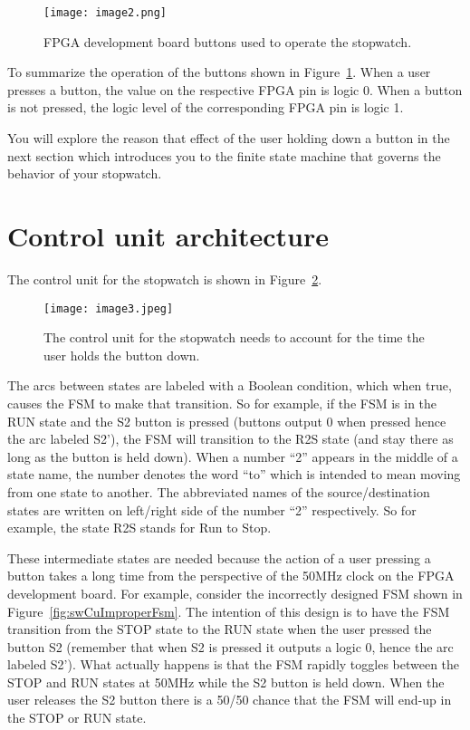 \begin{figure}[ht]
\texttt{[image: image2.png]}
\caption{FPGA development board buttons used to operate the stopwatch.}
\label{fig:swCuButtons}
\end{figure}

To summarize the operation of the buttons shown in Figure~\ref{fig:swCuButtons}. When a user
presses a button, the value on the respective FPGA pin is logic 0. When
a button is not pressed, the logic level of the corresponding FPGA pin
is logic 1.

You will explore the reason that effect of the user holding down a
button in the next section which introduces you to the finite state
machine that governs the behavior of your stopwatch.

\section{Control unit architecture}

The control unit for the stopwatch is shown in Figure~\ref{fig:swCuStateDiagram}.

\begin{figure}[ht]
\texttt{[image: image3.jpeg]}
\caption{The control unit for the stopwatch needs to account for the
time the user holds the button down.}
\label{fig:swCuStateDiagram}
\end{figure}

The arcs between states are labeled with a Boolean condition, which when
true, causes the FSM to make that transition. So for example, if the FSM
is in the RUN state and the S2 button is pressed (buttons output 0 when
pressed hence the arc labeled S2'), the FSM will transition to the R2S
state (and stay there as long as the button is held down). When a number
``2'' appears in the middle of a state name, the number denotes the word
``to'' which is intended to mean moving from one state to another. The
abbreviated names of the source/destination states are written on
left/right side of the number ``2'' respectively. So for example, the
state R2S stands for Run to Stop.

These intermediate states are needed because the action of a user
pressing a button takes a long time from the perspective of the 50MHz
clock on the FPGA development board. For example, consider the incorrectly designed FSM
shown in Figure~\ref{fig:swCuImproperFsm}. The intention of this design is to have the FSM
transition from the STOP state to the RUN state when the user pressed
the button S2 (remember that when S2 is pressed it outputs a logic 0,
hence the arc labeled S2'). What actually happens is that the FSM
rapidly toggles between the STOP and RUN states at 50MHz while the S2
button is held down. When the user releases the S2 button there is a
50/50 chance that the FSM will end-up in the STOP or RUN state.

